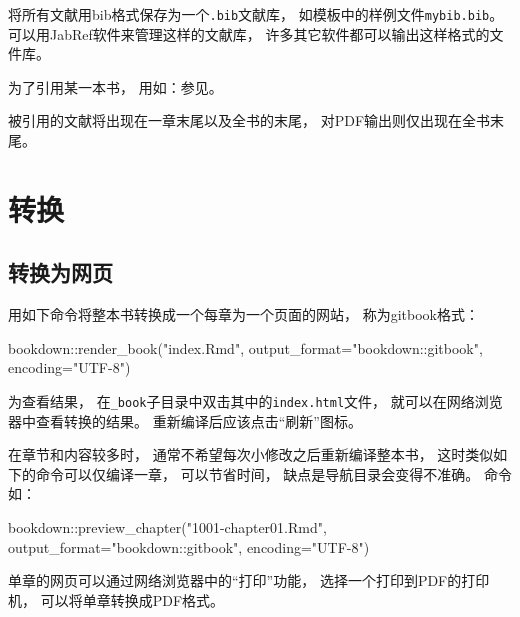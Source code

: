 \documentclass[
]{book}
\newenvironment{Shaded}{\begin{snugshade}}{\end{snugshade}}
\newcommand{\AttributeTok}[1]{\textcolor[rgb]{0.77,0.63,0.00}{#1}}
\newcommand{\FunctionTok}[1]{\textcolor[rgb]{0.00,0.00,0.00}{#1}}
\newcommand{\NormalTok}[1]{#1}
\newcommand{\SpecialCharTok}[1]{\textcolor[rgb]{0.00,0.00,0.00}{#1}}
\newcommand{\StringTok}[1]{\textcolor[rgb]{0.31,0.60,0.02}{#1}}
\begin{document}
将所有文献用bib格式保存为一个\texttt{.bib}文献库，
如模板中的样例文件\texttt{mybib.bib}。
可以用JabRef软件来管理这样的文献库，
许多其它软件都可以输出这样格式的文件库。

为了引用某一本书，
用如：参见\autocite{Wichmann1982:RNG}。

被引用的文献将出现在一章末尾以及全书的末尾，
对PDF输出则仅出现在全书末尾。

\hypertarget{usage-output}{%
\section{转换}\label{usage-output}}

\hypertarget{usage-gitbook}{%
\subsection{转换为网页}\label{usage-gitbook}}

用如下命令将整本书转换成一个每章为一个页面的网站，
称为gitbook格式：

\begin{Shaded}
\begin{Highlighting}[]
\NormalTok{bookdown}\SpecialCharTok{::}\FunctionTok{render\_book}\NormalTok{(}\StringTok{"index.Rmd"}\NormalTok{, }
  \AttributeTok{output\_format=}\StringTok{"bookdown::gitbook"}\NormalTok{, }\AttributeTok{encoding=}\StringTok{"UTF{-}8"}\NormalTok{)}
\end{Highlighting}
\end{Shaded}

为查看结果，
在\texttt{\_book}子目录中双击其中的\texttt{index.html}文件，
就可以在网络浏览器中查看转换的结果。
重新编译后应该点击``刷新''图标。

在章节和内容较多时，
通常不希望每次小修改之后重新编译整本书，
这时类似如下的命令可以仅编译一章，
可以节省时间，
缺点是导航目录会变得不准确。
命令如：

\begin{Shaded}
\begin{Highlighting}[]
\NormalTok{bookdown}\SpecialCharTok{::}\FunctionTok{preview\_chapter}\NormalTok{(}\StringTok{"1001{-}chapter01.Rmd"}\NormalTok{,}
  \AttributeTok{output\_format=}\StringTok{"bookdown::gitbook"}\NormalTok{, }\AttributeTok{encoding=}\StringTok{"UTF{-}8"}\NormalTok{)}
\end{Highlighting}
\end{Shaded}

单章的网页可以通过网络浏览器中的``打印''功能，
选择一个打印到PDF的打印机，
可以将单章转换成PDF格式。
\end{document}
